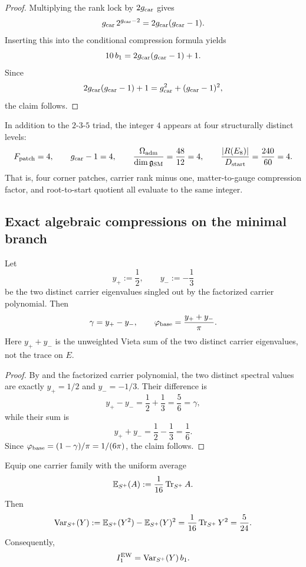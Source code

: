 \begin{proof}
Multiplying the rank lock by $2g_{\mathrm{car}}$ gives
\[
g_{\mathrm{car}}\,2^{g_{\mathrm{car}}-2}=2g_{\mathrm{car}}(g_{\mathrm{car}}-1).
\]
Inserting this into the conditional compression formula yields
\[
10\,b_1=2g_{\mathrm{car}}(g_{\mathrm{car}}-1)+1.
\]
Since
\[
2g_{\mathrm{car}}(g_{\mathrm{car}}-1)+1=g_{\mathrm{car}}^2+(g_{\mathrm{car}}-1)^2,
\]
the claim follows.
\end{proof}

\begin{remark}
In addition to the $2$-$3$-$5$ triad, the integer $4$ appears at four structurally distinct levels:
\[
F_{\mathrm{patch}}=4,
\qquad
g_{\mathrm{car}}-1=4,
\qquad
\frac{\Omega_{\mathrm{adm}}}{\dim\mathfrak g_{\mathrm{SM}}}=\frac{48}{12}=4,
\qquad
\frac{|R(E_8)|}{D_{\mathrm{start}}}=\frac{240}{60}=4.
\]
That is, four corner patches, carrier rank minus one, matter-to-gauge compression factor, and root-to-start quotient all evaluate to the same integer.
\end{remark}

\subsection{Exact algebraic compressions on the minimal branch}

\begin{corollary}
Let
\[
y_+:=\frac12,
\qquad
y_-:=-\frac13
\]
be the two distinct carrier eigenvalues singled out by the factorized carrier polynomial. Then
\[
\gamma=y_+-y_-,
\qquad
\varphi_{\mathrm{base}}=\frac{y_++y_-}{\pi}.
\]
Here $y_++y_-$ is the unweighted Vieta sum of the two distinct carrier eigenvalues, not the trace on $E$.
\end{corollary}

\begin{proof}
By  and the factorized carrier polynomial, the two distinct spectral values are exactly $y_+=1/2$ and $y_-=-1/3$. Their difference is
\[
y_+-y_-=\frac12+\frac13=\frac56=\gamma,
\]
while their sum is
\[
y_++y_-=\frac12-\frac13=\frac16.
\]
Since $\varphi_{\mathrm{base}}=(1-\gamma)/\pi=1/(6\pi)$, the claim follows.
\end{proof}

\begin{corollary}
Equip one carrier family with the uniform average
\[
\mathbb E_{S^+}(A):=\frac{1}{16}\operatorname{Tr}_{S^+}A.
\]
Then
\[
\operatorname{Var}_{S^+}(Y)
:=
\mathbb E_{S^+}(Y^2)-\mathbb E_{S^+}(Y)^2
=
\frac{1}{16}\operatorname{Tr}_{S^+}Y^2
=
\frac{5}{24}.
\]
Consequently,
\[
I_1^{\mathrm{EW}}=\operatorname{Var}_{S^+}(Y)\,b_1.
\]
\end{corollary}

